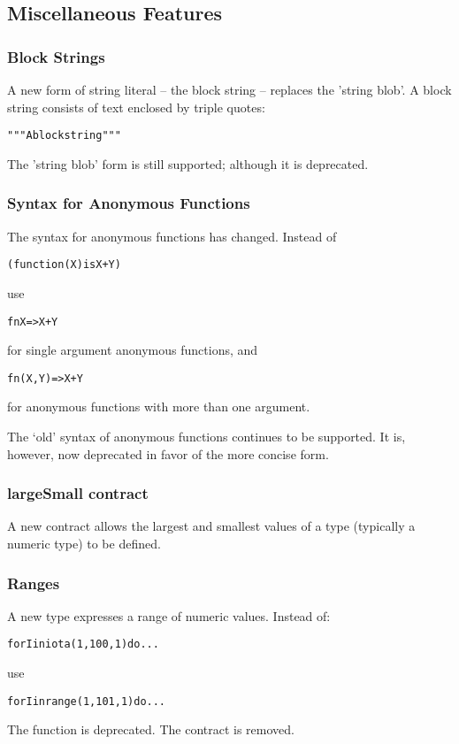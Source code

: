 \subsection{Miscellaneous Features}

\subsubsection{Block Strings}
A new form of string literal -- the block string -- replaces the 'string blob'. A block string consists of text enclosed by triple quotes:
\begin{alltt}
"""A block string"""
\end{alltt}

\begin{aside}
The 'string blob' form is still supported; although it is deprecated.
\end{aside}

\subsubsection{Syntax for Anonymous Functions}
The syntax for anonymous functions has changed. Instead of
\begin{alltt}
(function(X) is X+Y)
\end{alltt}
use 
\begin{alltt}
fn X=>X+Y
\end{alltt}
for single argument anonymous functions, and
\begin{alltt}
fn(X,Y) => X+Y
\end{alltt}
for anonymous functions with more than one argument.

\begin{aside}
The `old' syntax of anonymous functions continues to be supported. It is, however, now deprecated in favor of the more concise form.
\end{aside}

\subsubsection{largeSmall contract}
A new contract  allows the largest and smallest values of a type (typically a numeric type) to be defined.

\subsubsection{Ranges}
A new type  expresses a range of numeric values. Instead of:
\begin{alltt}
for I in iota(1,100,1) do ...
\end{alltt}
use
\begin{alltt}
for I in range(1,101,1) do ...
\end{alltt}
The  function is deprecated. The  contract is removed.

